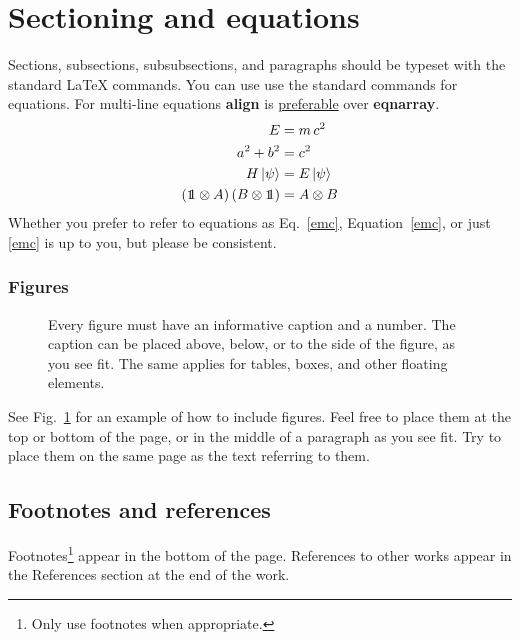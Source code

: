 \documentclass[prx,a4paper,aps,twocolumn,superscriptaddress,11pt]{quantumarticle}
\begin{document}
\section{Sectioning and equations}
Sections, subsections, subsubsections, and paragraphs should be typeset with the standard LaTeX commands.
You can use use the standard commands for equations.
For multi-line equations \textbf{align} is \href{http://tex.stackexchange.com/questions/196/eqnarray-vs-align}{preferable} over \textbf{eqnarray}.
\begin{align}
  \label{emc}
  E &= m\,c^2\\
  a^2 + b^2 &= c^2\\
  H\,|\psi\rangle &= E\,|\psi\rangle\\
  ({\mbox{\small1}\mkern-5.5mu1} \otimes A)\,(B \otimes {\mbox{\small1}\mkern-5.5mu1}) &= A \otimes B
\end{align}
Whether you prefer to refer to equations as Eq.~\eqref{emc}, Equation~\ref{emc}, or just \eqref{emc} is up to you, but please be consistent.

\subsubsection{Figures}
\begin{figure}[t]
  \centering
  \caption{Every figure must have an informative caption and a number.
    The caption can be placed above, below, or to the side of the figure, as you see fit.
    The same applies for tables, boxes, and other floating elements.}
  \label{fig:figure1}
\end{figure}

See Fig.~\ref{fig:figure1} for an example of how to include figures.
Feel free to place them at the top or bottom of the page, or in the middle of a paragraph as you see fit.
Try to place them on the same page as the text referring to them.

\subsection{Footnotes and references}
\label{sec:subsec1}
Footnotes\footnote{Only use footnotes when appropriate.} appear in the bottom of the page.
References to other works \cite{Foo2035} appear in the References section at the end of the work.
\end{document}
